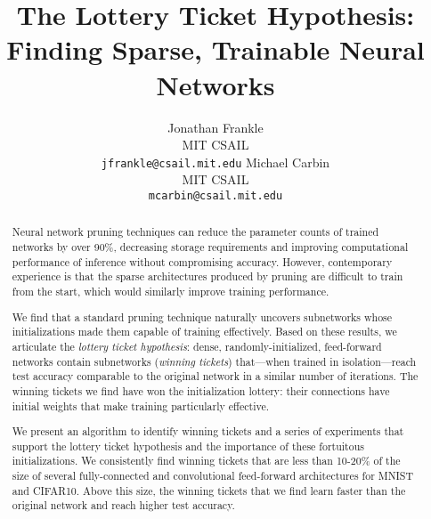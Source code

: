 \documentclass{article}
\title{The Lottery Ticket Hypothesis:\\Finding Sparse, Trainable Neural Networks}
\author{Jonathan Frankle\\MIT CSAIL\\\texttt{jfrankle@csail.mit.edu} \And Michael Carbin\\MIT CSAIL\\\texttt{mcarbin@csail.mit.edu}}
\begin{document}
\maketitle

\begin{abstract}
Neural network pruning techniques can reduce the parameter counts of trained networks by over 90\%, decreasing storage
requirements and improving computational performance of inference without compromising accuracy.
However, contemporary experience is that the sparse architectures produced by pruning are difficult to train
from the start, which would similarly improve training performance.

\vspace{.5em}
We find that a standard pruning technique
naturally uncovers subnetworks whose initializations made them capable of training effectively.
Based on these results, we articulate
the \emph{lottery ticket hypothesis}: dense, randomly-initialized, feed-forward networks contain
subnetworks (\emph{winning tickets}) that---when trained in isolation---reach test accuracy comparable to the original network in a similar number of iterations.
The winning tickets we find
have won the initialization lottery: their connections have initial weights that make training particularly effective.

\vspace{.5em}
We present an algorithm to identify winning tickets and a series of experiments that support
the lottery ticket hypothesis and the importance of these fortuitous initializations. 
We consistently find winning tickets that are less than 10-20\% of the size of
several fully-connected and convolutional feed-forward architectures for MNIST and CIFAR10.
Above this size, the winning tickets that we find learn faster
than the original network and reach higher test accuracy.

\end{abstract}
























\newpage

\begin{appendix}





















\end{appendix}
\end{document}
